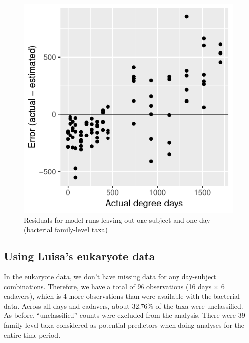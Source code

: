 \documentclass{article}
\begin{document}
\begin{figure}
  \centering
  \includegraphics{../revise_algorithm/only_families/all_time_steps/hit_1perc_twice/leave_out_one_subj_and_one_day_residuals}
  \caption{Residuals for model runs leaving out one subject and one day (bacterial family-level taxa)}
  \label{fig:leave_one_out_resids_bac_family_taxa}
\end{figure}


\subsection{Using Luisa's eukaryote data}

In the eukaryote data, we don't have missing data for any day-subject
combinations.  Therefore, we have a total of 96 observations (16 days
$\times$ 6 cadavers), which is 4 more observations than were available
with the bacterial data.  Across all days and cadavers, about 32.76\%
of the taxa were unclassified.  As before, ``unclassified'' counts
were excluded from the analysis.  There were 39 family-level taxa
considered as potential predictors when doing analyses for the entire
time period.
\end{document}
